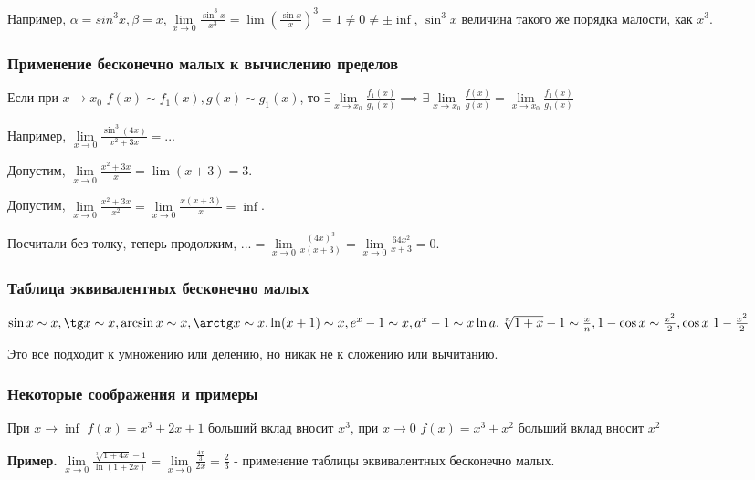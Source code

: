 \documentclass{article}
\begin{document}
\begin{flushleft}
Например, $\alpha = sin^3 x, \beta = x, \lim\limits_{x \to 0} \frac{\sin^3 x}{x^3} = \lim (\frac{\sin x}{x})^3 = 1 \ne 0 \ne \pm \inf$, $\sin^3 x$ величина такого же порядка малости, как $x^3$.

\subsubsection{Применение бесконечно малых к вычислению пределов}

Если при $x \to x_0$  $f(x) \sim f_1(x), g(x) \sim g_1(x)$, то $\exists \lim\limits_{x \to x_0} \frac{f_1(x)}{g_1(x)} \implies \exists \lim\limits_{x \to x_0} \frac{f(x)}{g(x)} = \lim\limits_{x \to x_0} \frac{f_1(x)}{g_1(x)}$ 

\hfill

Например, $\lim\limits_{x \to 0} \frac{\sin^3 (4x)}{x^2 + 3x} = ...$

Допустим, $\lim\limits_{x \to 0} \frac{x^2 + 3x}{x} = \lim (x+3) = 3$.

Допустим, $\lim\limits_{x \to 0} \frac{x^2 + 3x}{x^2} = \lim\limits_{x \to 0} \frac{x(x + 3)}{x} = \inf$.

Посчитали без толку, теперь продолжим, $... = \lim\limits_{x \to 0} \frac{(4x)^3}{x(x + 3)} = \lim\limits_{x \to 0} \frac{64x^2}{x + 3} = 0$.

\subsubsection{Таблица эквивалентных бесконечно малых}

$\sin x \sim x, \tg x \sim x, \arcsin x \sim x, \arctg x \sim x, \ln (x + 1) \sim x, e^x - 1 \sim x, a^x - 1 \sim x \ln a, \sqrt[n]{1 + x} - 1 \sim \frac{x}{n}, 1 - \cos x \sim \frac{x^2}{2}, \cos x ~ 1 - \frac{x^2}{2}$

Это все подходит к умножению или делению, но никак не к сложению или вычитанию.

\subsubsection{Некоторые соображения и примеры}

При $x \to \inf$ $f(x) = x^3 + 2x + 1$ больший вклад вносит $x^3$, при $x \to 0$ $f(x) = x^3 + x^2$ больший вклад вносит $x^2$

\hfill 

\textbf{Пример.} $\lim\limits_{x \to 0} \frac{\sqrt[3]{1 + 4x} - 1}{\ln (1 + 2x)} = \lim\limits_{x \to 0} \frac{\frac{4x}{3}}{2x} = \frac{2}{3}$ - применение таблицы эквивалентных бесконечно малых.


\end{flushleft}
\end{document}
